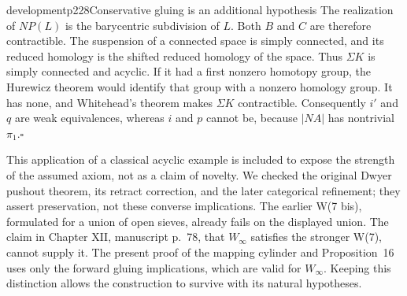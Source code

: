 \begin{dcomment}{development}{p228}{Conservative gluing is an additional hypothesis}
The realization of $NP(L)$ is the barycentric subdivision of $L$. Both $B$ and $C$ are therefore contractible. The suspension of a connected space is simply connected, and its reduced homology is the shifted reduced homology of the space. Thus $\Sigma K$ is simply connected and acyclic. If it had a first nonzero homotopy group, the Hurewicz theorem would identify that group with a nonzero homology group. It has none, and Whitehead's theorem makes $\Sigma K$ contractible. Consequently $i'$ and $q$ are weak equivalences, whereas $i$ and $p$ cannot be, because $|NA|$ has nontrivial $\pi_1$.\hfill$\square$

This application of a classical acyclic example is included to expose the strength of the assumed axiom, not as a claim of novelty. We checked the original Dwyer pushout theorem, its retract correction, and the later categorical refinement; they assert preservation, not these converse implications. The earlier W(7 bis), formulated for a union of open sieves, already fails on the displayed union. The claim in Chapter XII, manuscript p.~78, that $W_\infty$ satisfies the stronger W(7), cannot supply it. The present proof of the mapping cylinder and Proposition~16 uses only the forward gluing implications, which are valid for $W_\infty$. Keeping this distinction allows the construction to survive with its natural hypotheses.
\end{dcomment}

